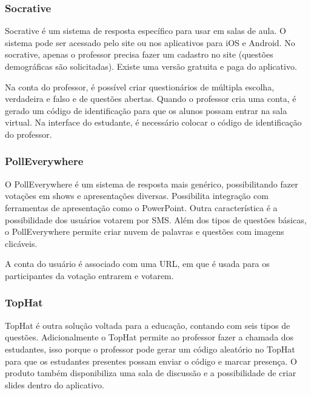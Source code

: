 \subsubsection{Socrative}

Socrative é um sistema de resposta específico para usar em salas de aula. O sistema pode ser
acessado pelo site ou nos aplicativos para iOS e Android. No socrative, apenas o professor
precisa fazer um cadastro no site (questões demográficas são solicitadas). Existe uma versão
gratuita e paga do aplicativo.

Na conta do professor, é possível criar questionários de múltipla escolha, verdadeira e falso e
de questões abertas. Quando o professor cria uma conta, é gerado um código de identificação
para que os alunos possam entrar na sala virtual. Na interface do estudante, é necessário
colocar o código de identificação do professor.

\subsubsection{PollEverywhere}

O PollEverywhere é um sistema de resposta mais genérico, possibilitando fazer votações em
shows e apresentações diversas. Possibilita integração com ferramentas de apresentação
como o PowerPoint. Outra característica é a possibilidade dos usuários votarem por SMS.
Além dos tipos de questões básicas, o PollEverywhere permite criar nuvem de palavras e
questões com imagens clicáveis.

A conta do usuário é associado com uma URL, em que é usada para os participantes
da votação entrarem e votarem.

\subsubsection{TopHat}

TopHat é outra solução voltada para a educação, contando com seis tipos de questões.
Adicionalmente o TopHat permite ao professor fazer a chamada dos estudantes, isso porque
o professor pode gerar um código aleatório no TopHat para que os estudantes presentes
possam enviar o código e marcar presença. O produto também disponibiliza uma sala
de discussão e a possibilidade de criar slides dentro do aplicativo.

